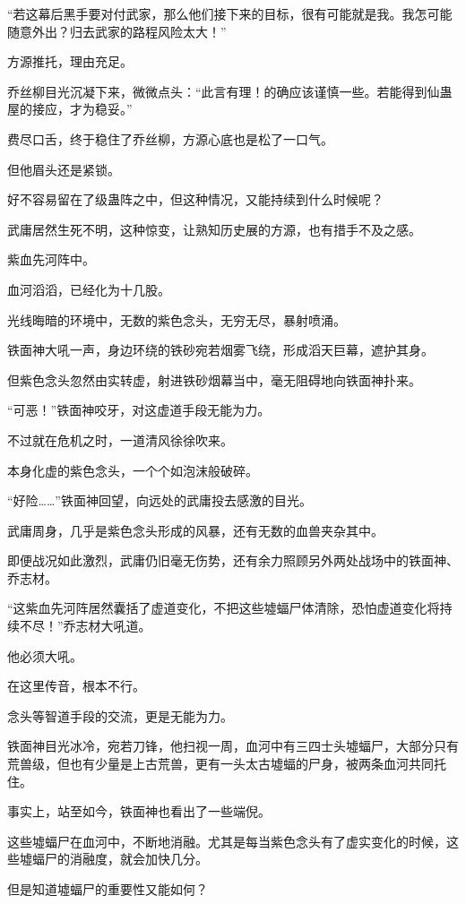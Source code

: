 \begin{this_body}
“若这幕后黑手要对付武家，那么他们接下来的目标，很有可能就是我。我怎可能随意外出？归去武家的路程风险太大！”

方源推托，理由充足。

乔丝柳目光沉凝下来，微微点头：“此言有理！的确应该谨慎一些。若能得到仙蛊屋的接应，才为稳妥。”

费尽口舌，终于稳住了乔丝柳，方源心底也是松了一口气。

但他眉头还是紧锁。

好不容易留在了级蛊阵之中，但这种情况，又能持续到什么时候呢？

武庸居然生死不明，这种惊变，让熟知历史展的方源，也有措手不及之感。

紫血先河阵中。

血河滔滔，已经化为十几股。

光线晦暗的环境中，无数的紫色念头，无穷无尽，暴射喷涌。

铁面神大吼一声，身边环绕的铁砂宛若烟雾飞绕，形成滔天巨幕，遮护其身。

但紫色念头忽然由实转虚，射进铁砂烟幕当中，毫无阻碍地向铁面神扑来。

“可恶！”铁面神咬牙，对这虚道手段无能为力。

不过就在危机之时，一道清风徐徐吹来。

本身化虚的紫色念头，一个个如泡沫般破碎。

“好险……”铁面神回望，向远处的武庸投去感激的目光。

武庸周身，几乎是紫色念头形成的风暴，还有无数的血兽夹杂其中。

即便战况如此激烈，武庸仍旧毫无伤势，还有余力照顾另外两处战场中的铁面神、乔志材。

“这紫血先河阵居然囊括了虚道变化，不把这些墟蝠尸体清除，恐怕虚道变化将持续不尽！”乔志材大吼道。

他必须大吼。

在这里传音，根本不行。

念头等智道手段的交流，更是无能为力。

铁面神目光冰冷，宛若刀锋，他扫视一周，血河中有三四士头墟蝠尸，大部分只有荒兽级，但也有少量是上古荒兽，更有一头太古墟蝠的尸身，被两条血河共同托住。

事实上，站至如今，铁面神也看出了一些端倪。

这些墟蝠尸在血河中，不断地消融。尤其是每当紫色念头有了虚实变化的时候，这些墟蝠尸的消融度，就会加快几分。

但是知道墟蝠尸的重要性又能如何？


\end{this_body}
